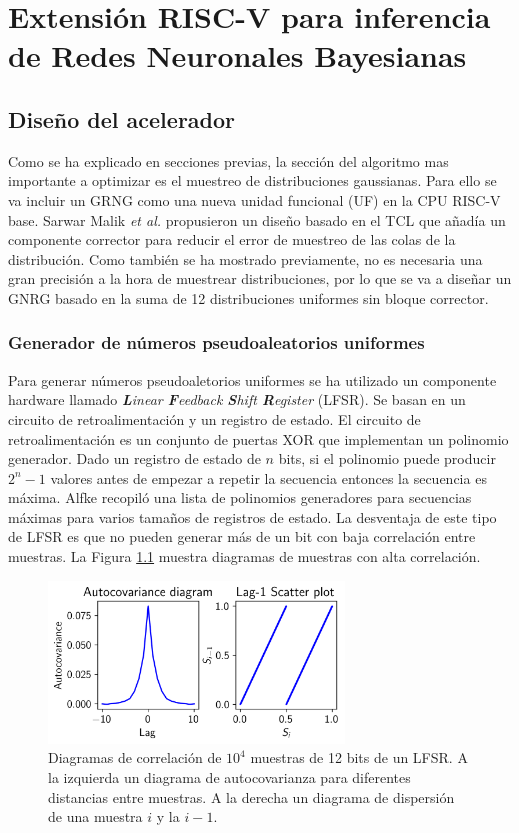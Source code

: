 \chapter{Extensión RISC-V para inferencia de Redes Neuronales Bayesianas}

\section{Diseño del acelerador}

Como se ha explicado en secciones previas, la sección del algoritmo mas importante a optimizar es el muestreo de distribuciones gaussianas. Para ello se va incluir un GRNG como una nueva unidad funcional (UF) en la CPU RISC-V base. Sarwar Malik \emph{et al.} \cite{clt_grng} propusieron un diseño basado en el TCL que añadía un componente corrector para reducir el error de muestreo de las colas de la distribución. Como también se ha mostrado previamente, no es necesaria una gran precisión a la hora de muestrear distribuciones, por lo que se va a diseñar un GNRG basado en la suma de 12 distribuciones uniformes sin bloque corrector.

\subsection{Generador de números pseudoaleatorios uniformes}

Para generar números pseudoaletorios uniformes se ha utilizado un componente hardware llamado \textit{\textbf{L}inear \textbf{F}eedback \textbf{S}hift \textbf{R}egister} (LFSR). Se basan en un circuito de retroalimentación y un registro de estado. El circuito de retroalimentación es un conjunto de puertas XOR que implementan un polinomio generador. Dado un registro de estado de $n$ bits, si el polinomio puede producir $2^n-1$ valores antes de empezar a repetir la secuencia entonces la secuencia es máxima. Alfke \cite{lfsr_poly} recopiló una lista de polinomios generadores para secuencias máximas para varios tamaños de registros de estado. La desventaja de este tipo de LFSR es que no pueden generar más de un bit con baja correlación entre muestras. La Figura \ref{fig:lfsr_bar_corr} muestra diagramas de muestras con alta correlación.

\begin{figure}[h]
    \centering
    \includegraphics[width=0.7\textwidth]{root/Imagenes/5_riscv/lfsr_bar_corr.png}
    \caption{Diagramas de correlación de $10^4$ muestras de 12 bits de un LFSR. A la izquierda un diagrama de autocovarianza para diferentes distancias entre muestras. A la derecha un diagrama de dispersión de una muestra $i$ y la $i-1$.}
    \label{fig:lfsr_bar_corr}
\end{figure}

